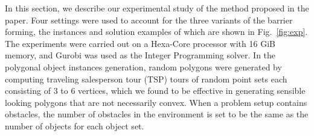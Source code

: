 In this section, we describe our experimental study of the method proposed in the paper.
Four settings were used to account for the three variants of the barrier forming, the instances and solution examples of which are shown in Fig.~\ref{fig:exp}. 
The experiments were carried out on a Hexa-Core processor with 16 GiB memory, and Gurobi
\cite{optimization2019gurobi} was used as the Integer Programming solver.
In the polygonal object instances generation, random polygons were generated by computing traveling salesperson tour (TSP) tours of random point sets each consisting of $3$ to $6$ vertices, which we found to be effective in generating sensible looking polygons that are not necessarily convex.
%
When a problem setup contains obstacles, the number of obstacles in the environment is set to be the same as the number of objects for each object set.



